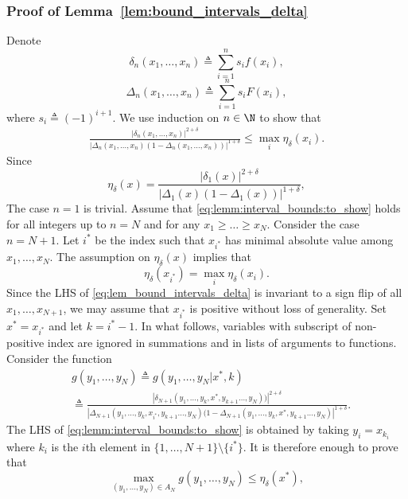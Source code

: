\subsubsection*{
Proof of Lemma~\ref{lem:bound_intervals_delta}}
Denote 
\[
\delta_n(x_1,\ldots,x_n) \triangleq \sum_{i=1}^{n} s_i f(x_i),
\]
\[
 \Delta_n(x_1,\ldots,x_n) \triangleq  \sum_{i=1}^n s_i F(x_i), 
\]
where $s_i \triangleq (-1)^{i+1}$. We use induction on $n \in \N$ to show that 
\begin{align}
\label{eq:lemm:interval_bounds:to_show}
\frac{ \left| \delta_n(x_1,\ldots,x_n) \right|^{2+\delta}} 
{\left|\Delta_n(x_1,\ldots,x_n)\left(1- \Delta_n(x_1,\ldots,x_n) \right) \right|^{1+\delta} } \leq \max_{i}\eta_{\delta}(x_i).
\end{align}
 Since 
\[
\eta_\delta(x) =  \frac{  \left|\delta_1(x) \right|^{2+\delta}}{\left|\Delta_1(x)
(1-\Delta_1(x)) \right|^{1+\delta}}, 
\]
The case $n=1$ is trivial.  
Assume that \eqref{eq:lemm:interval_bounds:to_show} holds for all integers up to $n = N$ and for any $x_1 \ge \ldots \ge x_N$. Consider the case $n = N+1$. Let $i^*$ be the index such that $x_{i^*}$ has minimal absolute value among $x_1,\ldots,x_N$. The assumption on $\eta_\delta(x)$ implies that
\[
\eta_\delta(x_{i^*}) = \max_i \eta_\delta(x_i).
\]
Since the LHS of \eqref{eq:lem_bound_intervals_delta} is invariant to a sign flip of all $x_1,\ldots,x_{N+1}$, we may assume that $x_{i^*}$ is positive without loss of generality. 
Set $x^* = x_{i^*}$ and let $k=i^*-1$. In what follows, variables with subscript of non-positive index are ignored in summations and in lists of arguments to functions. Consider the function
\begin{align}
& g(y_1,\ldots,y_N) \triangleq g(y_1,\ldots,y_N|x^*,k) \\
&  \triangleq  \frac{\left| \delta_{N+1}(y_1,\ldots,y_k,x^*,y_{k+1}\ldots,y_N) )\right|^{2+\delta}}{
\left|\Delta_{N+1}(y_1,\ldots,y_k,x_{i^*},y_{k+1}\ldots,y_N)  (1 -\Delta_{N+1}(y_1,\ldots,y_k,x^*,y_{k+1}\ldots,y_N)  \right|^{1+\delta}
} \label{eq:g_def}.
\end{align}
The LHS of \eqref{eq:lemm:interval_bounds:to_show} is obtained by taking $y_i=x_{k_i}$ where $k_i$ is the $i$th element in $\{1,\ldots,N+1\}\setminus \{i^*\}$. It is therefore enough to prove that 
\[
\max_{(y_1,\ldots,y_N) \in A_N} g(y_1,\ldots,y_N) \leq \eta_{\delta}(x^*),
\]
